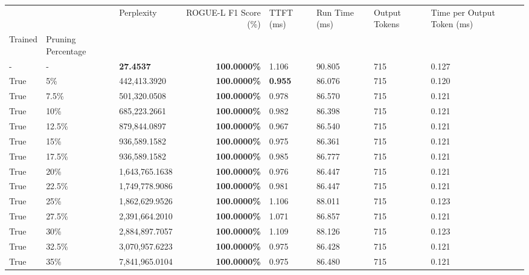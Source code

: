 \begin{table}[H]
\label{tab:evaluation-pipeline-2}
\begin{tabular}{lllrllll}
\toprule
 &  & Perplexity & ROGUE-L F1 Score (\%) & TTFT (ms) & Run Time (ms) & Output Tokens & Time per Output Token (ms) \\
Trained & Pruning Percentage &  &  &  &  &  &  \\
\midrule
- & - & \bfseries 27.4537 & \bfseries 100.0000\% & 1.106 & 90.805 & 715 & 0.127 \\
\cline{1-8} \cline{2-8}
True & 5\% & 442,413.3920 & \bfseries \color{red} 100.0000\% & \bfseries \color{red} 0.955 & 86.076 & 715 & 0.120 \\
\cline{1-8} \cline{2-8}
True & 7.5\% & 501,320.0508 & \bfseries \color{red} 100.0000\% & 0.978 & 86.570 & 715 & 0.121 \\
\cline{1-8} \cline{2-8}
True & 10\% & 685,223.2661 & \bfseries \color{red} 100.0000\% & 0.982 & 86.398 & 715 & 0.121 \\
\cline{1-8} \cline{2-8}
True & 12.5\% & 879,844.0897 & \bfseries \color{red} 100.0000\% & 0.967 & 86.540 & 715 & 0.121 \\
\cline{1-8} \cline{2-8}
True & 15\% & 936,589.1582 & \bfseries \color{red} 100.0000\% & 0.975 & 86.361 & 715 & 0.121 \\
\cline{1-8} \cline{2-8}
True & 17.5\% & 936,589.1582 & \bfseries \color{red} 100.0000\% & 0.985 & 86.777 & 715 & 0.121 \\
\cline{1-8} \cline{2-8}
True & 20\% & 1,643,765.1638 & \bfseries \color{red} 100.0000\% & 0.976 & 86.447 & 715 & 0.121 \\
\cline{1-8} \cline{2-8}
True & 22.5\% & 1,749,778.9086 & \bfseries \color{red} 100.0000\% & 0.981 & 86.447 & 715 & 0.121 \\
\cline{1-8} \cline{2-8}
True & 25\% & 1,862,629.9526 & \bfseries \color{red} 100.0000\% & 1.106 & 88.011 & 715 & 0.123 \\
\cline{1-8} \cline{2-8}
True & 27.5\% & 2,391,664.2010 & \bfseries \color{red} 100.0000\% & 1.071 & 86.857 & 715 & 0.121 \\
\cline{1-8} \cline{2-8}
True & 30\% & 2,884,897.7057 & \bfseries \color{red} 100.0000\% & 1.109 & 88.126 & 715 & 0.123 \\
\cline{1-8} \cline{2-8}
True & 32.5\% & 3,070,957.6223 & \bfseries \color{red} 100.0000\% & 0.975 & 86.428 & 715 & 0.121 \\
\cline{1-8} \cline{2-8}
True & 35\% & 7,841,965.0104 & \bfseries \color{red} 100.0000\% & 0.975 & 86.480 & 715 & 0.121 \\

\end{tabular}
\end{table}
